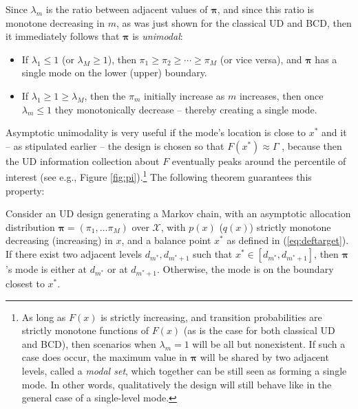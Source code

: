 Since $\lambda_m$ is the ratio between adjacent values of $\boldsymbol{\pi}$, and since this ratio is monotone decreasing in $m$, as was just shown for the classical UD and BCD, then it immediately follows that $\boldsymbol{\pi}$ is \emph{unimodal}:

\begin{itemize}
\item  If $\lambda_1\leq 1$ (or $\lambda_M\geq 1$), then $\pi_1\geq\pi_2\geq\cdots\geq\pi_M$ (or vice versa), and $\boldsymbol{\pi}$ has a single mode on the lower (upper) boundary.
\item If $\lambda_1\geq 1\geq\lambda_M$, then the $\pi_m$ initially increase as $m$ increases, then once $\lambda_m\leq 1$ they monotonically decrease -- thereby creating a single mode.
\end{itemize}

Asymptotic unimodality is very useful if the mode's location is close to $x^*$ and it -- as stipulated earlier -- the design is chosen so that $F(x^*)\approx\Gamma$ , because then the UD information collection about $F$ eventually peaks around the percentile of interest (see e.g., Figure \ref{fig:pi}).\footnote{As long as $F(x)$ is strictly increasing, and transition probabilities are strictly monotone functions of $F(x)$ (as is the case for both classical UD and BCD), then scenarios when $\lambda_m=1$ will be all but nonexistent. If such a case does occur, the maximum value in $\boldsymbol{\pi}$ will be shared by two adjacent levels, called a \emph{modal set}, which together can be still seen as forming a single mode. In other words, qualitatively the design will still behave like in the general case of a single-level mode.} The following theorem guarantees this property:

\begin{thm}\label{thm:mode} Consider an UD design generating a Markov chain, with an asymptotic allocation distribution $\boldsymbol{\pi}=\left(\pi_1,\ldots \pi_M\right)$ over $\mathcal{X}$, with $p(x)$ ($q(x)$) strictly monotone decreasing (increasing) in $x$, and a balance point $x^*$ as defined in (\ref{eq:deftarget}). If there exist two adjacent levels $d_{m^*},d_{m^*+1}$ such that $x^*\in\left[d_{m^*},d_{m^*+1}\right]$, then $\boldsymbol{\pi}$'s mode is either at $d_{m^*}$ or at $d_{m^*+1}$. Otherwise, the mode is on the boundary closest to $x^*$.
\end{thm}

